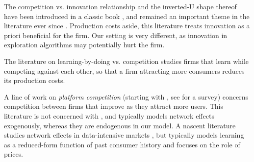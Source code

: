 

 The competition vs. innovation relationship and the inverted-U shape thereof have been introduced in a classic book \citep{Schumpeter-42}, and remained an important theme in the literature ever since \cite[\eg][]{aghion2005competition,Vives-08}. Production costs aside, this literature treats innovation as a priori beneficial for the firm. Our setting is very different, as innovation in exploration algorithms may potentially hurt the firm.

The literature on learning-by-doing vs. competition \citep[\eg][]{fudenberg1983learning, dasgupta1988learning, cabral1994learning} studies firms that learn while competing against each other, so that a firm attracting more consumers reduces its production costs. 


A line of work on \emph{platform competition} (starting with \cite{Rysman09}, see \citet{Weyl-White-14} for a survey) concerns competition between firms that improve as they attract more users. This literature is not concerned with \innovation, and typically models network effects exogenously, whereas they are endogenous in our model.
A nascent literature studies
network effects
in data-intensive markets \citep{prufer2017competing, hagiu2020data}, but typically models learning as a reduced-form function of past consumer history and focuses on the role of prices.

